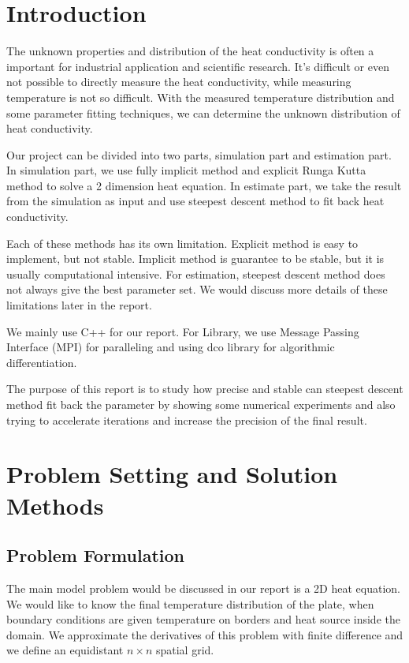 \documentclass[10pt,a4paper]{report}
\begin{document}
\chapter{Introduction}
The unknown properties and distribution of the heat conductivity is often a important for industrial application and scientific research. It's difficult or even not possible to directly measure the heat conductivity, while measuring temperature is not so difficult. With the measured temperature distribution and some parameter fitting techniques, we can determine the unknown distribution of heat conductivity.

Our project can be divided into two parts, simulation part and estimation part. In simulation part, we use fully implicit method and explicit Runga Kutta method to solve a 2 dimension heat equation. In estimate part, we take the result from the simulation as input and use steepest descent method to fit back heat conductivity.
 
Each of these methods has its own limitation. Explicit method is easy to implement, but not stable. Implicit method is guarantee to be stable, but it is usually computational intensive. For estimation, steepest descent method does not always give the best parameter set. We would discuss more details of these limitations later in the report. 
 
We mainly use C++ for our report. For Library, we use Message Passing Interface (MPI) for paralleling  and using dco library for algorithmic differentiation.

The purpose of this report is to study how precise and stable can steepest descent method fit back the parameter by showing some numerical experiments and also trying to accelerate iterations and increase the precision of the final result.  

\chapter{Problem Setting and Solution Methods}
\section{Problem Formulation}

The main model problem would be discussed in our report is a 2D heat equation. We would like to know the final temperature distribution of the plate, when boundary conditions are given temperature on borders and heat source inside the domain. We approximate the derivatives of this problem with finite difference and we define an equidistant $n \times  n$ spatial grid. 
\end{document}
